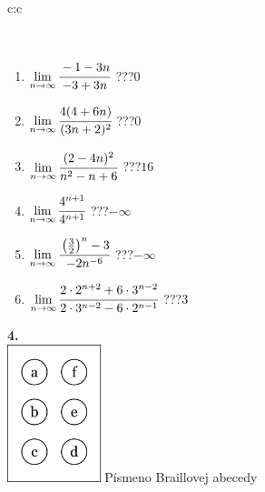 \documentclass[10pt]{report}
\begin{document}
\begin{tabular}{c:c}
\begin{minipage}[c][104.5mm][t]{0.5\linewidth}
\begin{center}
\begin{minipage}{0.95\linewidth}
\begin{center}
\end{center}
\end{minipage}
\\[1mm]
\begin{minipage}{0.79\linewidth}
\begin{center}
\begin{varwidth}{\linewidth}
\begin{enumerate}
\normalsize
\item $\lim\limits_{n\to\infty}\cfrac{-1-3n}{-3+3n}$\quad \dotfill\; ???\;\dotfill \quad $0$
\item $\lim\limits_{n\to\infty}\cfrac{4(4+6n)}{(3n+2)^2}$\quad \dotfill\; ???\;\dotfill \quad $0$
\item $\lim\limits_{n\to\infty}\cfrac{(2-4n)^2}{n^2-n+6}$\quad \dotfill\; ???\;\dotfill \quad $16$
\item $\lim\limits_{n\to\infty}\cfrac{4^{n+1}}{4^{n+1}}$\quad \dotfill\; ???\;\dotfill \quad $-\infty$
\item $\lim\limits_{n\to\infty}\cfrac{\left(\frac{3}{2}\right)^n -3}{-2n^{-6}}$\quad \dotfill\; ???\;\dotfill \quad $-\infty$
\item $\lim\limits_{n\to\infty}\cfrac{2\cdot 2^{n+2}+6\cdot 3^{n-2}}{2\cdot 3^{n-2}-6\cdot 2^{n-1}}$\quad \dotfill\; ???\;\dotfill \quad $3$
\end{enumerate}
\end{varwidth}
\end{center}
\end{minipage}
\begin{minipage}{0.20\linewidth}
\begin{center}
{\Huge\bfseries 4.} \\[2mm]
\includegraphics[height=40mm]{../images/braille.png}
{\small Písmeno Braillovej abecedy}
\end{center}
\end{minipage}
\end{center}
\end{minipage}
%
\end{tabular}
\newpage
\thispagestyle{empty}
\end{document}
